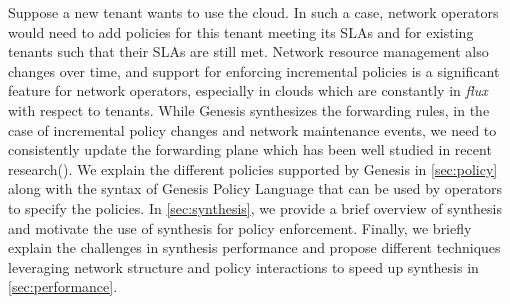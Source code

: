 \documentclass[]{sig}
\begin{document}
Suppose a new tenant wants to use the cloud. In such a case, network operators would need to add policies for this tenant meeting its SLAs and for existing tenants such that their SLAs are still met. Network resource management also changes over time, and support for enforcing incremental policies is a significant feature for network operators, especially in clouds which are constantly in \emph{flux} with respect to tenants.  While Genesis synthesizes the forwarding rules, in the case of incremental policy changes and network maintenance events, we need to consistently update the forwarding plane which has been well studied in recent research(\cite{updates}).  
We explain the different policies supported by Genesis in \cref{sec:policy} along with the syntax of Genesis Policy Language that can be used by operators to specify the policies. In \cref{sec:synthesis}, we provide a brief overview of synthesis and motivate the use of synthesis for policy enforcement. Finally, we briefly explain the challenges in synthesis performance and propose different techniques leveraging network structure and policy interactions to speed up synthesis in \cref{sec:performance}.
\end{document}
